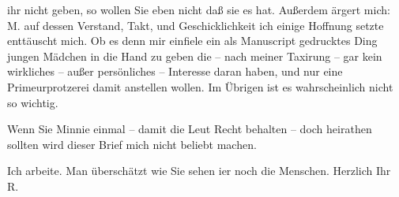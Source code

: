                ihr nicht geben, so wollen Sie eben nicht daß sie es hat. Außerdem ärgert mich: M. auf dessen Verstand, Takt, und
               Geschicklichkeit ich einige Hoffnung setzte enttäuscht mich. Ob es denn mir einfiele
               ein als Manuscript gedrucktes Ding jungen Mädchen in die Hand zu geben die – nach meiner Taxirung –
               gar kein wirkliches – außer persönliches – Interesse daran haben, und nur eine
               Primeurprotzerei damit anstellen wollen. Im Übrigen ist es wahrscheinlich nicht so
               wichtig.\pend
           
\pstart
           Wenn Sie Minnie einmal – damit die Leut Recht
               behalten – doch heirathen sollten wird dieser Brief mich nicht beliebt machen.\pend
           
\pstart
           Ich arbeite. Man überschätzt wie Sie sehen i{\geminationm}er noch die
               Menschen. Herzlich Ihr \spacefill\mbox{R.}\pend
           \endnumbering{}  
      
